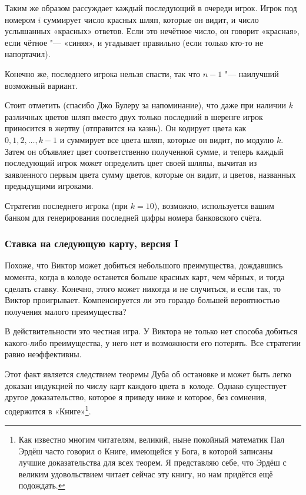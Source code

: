\documentclass[twoside]{book}
\begin{document}
Таким же образом рассуждает каждый последующий в очереди игрок.
Игрок под номером $i$ суммирует число красных шляп, которые он видит, и число услышанных «красных» ответов.
Если это нечётное число, он говорит «красная», если чётное "--- «синяя», и угадывает правильно (если только кто-то не напортачил).

Конечно же, последнего игрока нельзя спасти, так что $n-1$ "--- наилучший возможный вариант.
\heart

Стоит отметить (спасибо Джо Булеру %
за напоминание), что даже при наличии $k$ различных цветов шляп вместо двух только последний в шеренге игрок приносится в жертву (отправится на казнь).
Он кодирует цвета как $0, 1, 2, \dots, k-1$ и суммирует все цвета шляп, которые он видит, по модулю $k$.
Затем он объявляет цвет соответственно полученной сумме, и теперь каждый последующий игрок может определить цвет своей шляпы, вычитая из заявленного первым цвета сумму цветов, которые он видит, и цветов, названных предыдущими игроками.

Стратегия последнего игрока (при $k=10$), возможно, используется вашим банком для генерирования последней цифры номера банковского счёта.

\subsubsection*{Ставка на следующую карту, версия I}%

Похоже, что Виктор может добиться небольшого преимущества, дождавшись момента, когда в колоде останется больше красных карт, чем чёрных, и тогда сделать ставку.
Конечно, этого может никогда и не случиться, и если так, то Виктор проигрывает.
Компенсируется ли это гораздо большей вероятностью получения малого преимущества?

В действительности это честная игра.
У Виктора не только нет способа добиться какого-либо преимущества, у него нет и возможности его потерять.
Все стратегии равно неэффективны.

Этот факт является следствием теоремы Дуба об остановке %
и может быть легко доказан индукцией по числу карт каждого цвета в~колоде.
Однако существует другое доказательство, которое я приведу ниже и которое, без сомнения, содержится в «Книге»\footnote{Как известно многим читателям, великий, ныне покойный математик Пал Эрдёш часто говорил о Книге, имеющейся у Бога, в которой записаны лучшие доказательства для всех теорем.
Я представляю себе, что Эрдёш с великим удовольствием читает сейчас эту книгу, но нам придётся ещё подождать.}.
\end{document}
